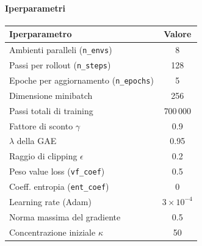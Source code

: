\paragraph{Iperparametri}
\begin{center}
\begin{tabular}{lc}
\toprule
Iperparametro & Valore \\
\midrule
Ambienti paralleli (\lstinline{n_envs})        & 8 \\
Passi per rollout (\lstinline{n_steps})        & 128 \\
Epoche per aggiornamento (\lstinline{n_epochs})& 5 \\
Dimensione minibatch                           & 256 \\
Passi totali di training                       & 700\,000 \\
Fattore di sconto $\gamma$                     & 0.9 \\
$\lambda$ della GAE                            & 0.95 \\
Raggio di clipping $\epsilon$                  & 0.2 \\
Peso value loss (\lstinline{vf_coef})          & 0.5 \\
Coeff. entropia (\lstinline{ent_coef})         & 0 \\
Learning rate (Adam)                           & $3\times10^{-4}$ \\
Norma massima del gradiente                    & 0.5 \\
Concentrazione iniziale $\kappa$               & 50 \\
\bottomrule
\end{tabular}
\end{center}

